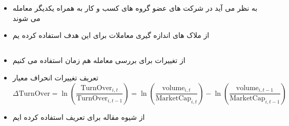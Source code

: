 \section{ }
\begin{itemize}
	\item 
	به نظر می آید در شرکت های عضو گروه های کسب و کار به همراه یکدیگر معامله می شوند
	\item
	از ملاک های اندازه گیری معاملات برای این هدف استفاده کرده یم
\end{itemize}
\subsection{}
\begin{itemize}
	\item 
	از تغییرات 
	برای بررسی معامله هم زمان استفاده می کنیم
	\item 
	تعریف تغییرات انحراف معیار
	\begin{equation}
			\Delta \text{TurnOver} = \ln(\frac{\text{TurnOver}_{i,t}}{\text{TurnOver}_{i,t-1}}) = 
		\ln({\frac{\text{volume}_{i,t}}{\text{MarketCap}_{i,t}}}) - \ln({\frac{\text{volume}_{i,t-1}}{\text{MarketCap}_{i,t-1}}})
	\end{equation}
	\item 
	از شیوه مقاله 
	برای تعریف استفاده کرده ایم
\end{itemize}


